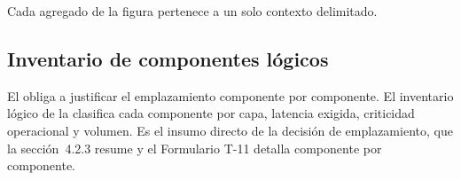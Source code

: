 
Cada agregado de la figura pertenece a un solo contexto delimitado.


\subsection{Inventario de componentes lógicos}\label{sec:4-inventario}

El  obliga a justificar el emplazamiento componente por componente. El inventario lógico
de la  clasifica cada componente por capa, latencia exigida, criticidad operacional
y volumen. Es el insumo directo de la decisión de emplazamiento, que la sección~4.2.3 resume y el
Formulario T-11 detalla componente por componente.

